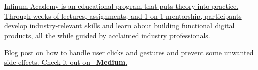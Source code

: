 \documentclass[theme]{cv_style}
\begin{document}
\begin{paracol}{2}
\begin{leftcolumn*}
{{\begin{minipage}[l]{0.9\leftcolwidth}
                    \vspace{\itemspace}\\
                    \vspace{\itemspace}\\
                \end{minipage}
            }%
        } %
        \end{leftcolumn*}
        \begin{rightcolumn}\noindent \small
            \hspace{-2.4pt}
            \href{https://infinum.academy/}{
            {Infinum Academy is an educational program that puts theory into practice. Through weeks of lectures, assignments, and 1-on-1 mentorship, participants develop industry-relevant skills and learn about building functional digital products, all the while guided by acclaimed industry professionals.}}

            \vspace{\sectionspace}
            \href{https://medium.com/azikus/android-how-to-handle-taps-247140d196e9}{
            {Blog post on how to handle user clicks and gestures and prevent some unwanted side effects. Check it out on \faMedium \ \textbf{Medium}.}}
        \end{rightcolumn}
        \vspace{20em}
    \end{paracol}
\end{document}
